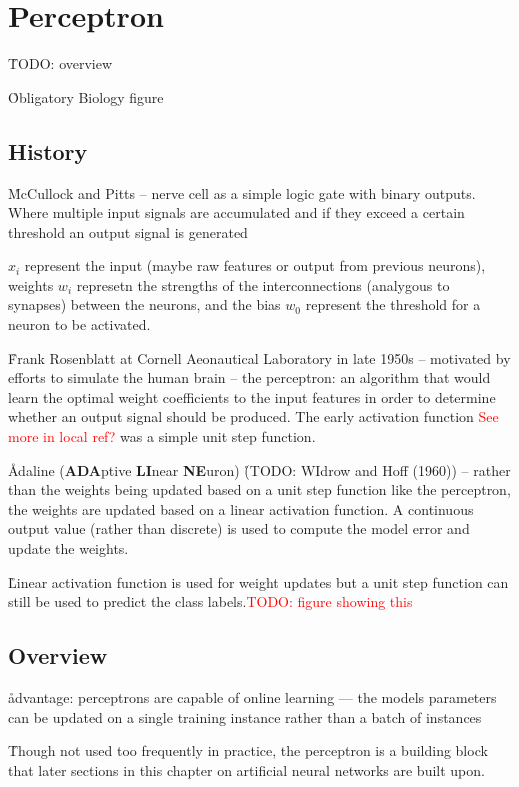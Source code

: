 \section{Perceptron}

\r{TODO: overview}

\r{Obligatory Biology figure}

\subsection{History}

\r{McCullock and Pitts -- nerve cell as a simple logic gate with binary outputs.  Where multiple input signals are accumulated and if they exceed a certain threshold an output signal is generated}

\r{$x_i$ represent the input (maybe raw features or output from previous neurons), weights $w_i$ represetn the strengths of the interconnections (analygous to synapses) between the neurons, and the bias $w_0$ represent the threshold for a neuron to be activated.}

\r{Frank Rosenblatt at Cornell Aeonautical Laboratory in late 1950s -- motivated by efforts to simulate the human brain -- the perceptron: an algorithm that would learn the optimal weight coefficients to the input features in order to determine whether an output signal should be produced. The early activation function \textcolor{red}{See more in local ref?} was a simple unit step function.}

\r{Adaline (\textbf{ADA}ptive \textbf{LI}near \textbf{NE}uron) \r{(TODO: WIdrow and Hoff (1960))} -- rather than the weights being updated based on a unit step function like the perceptron, the weights are updated based on a linear activation function. A continuous output value (rather than discrete) is used to compute the model error and update the weights.}

\r{Linear activation function is used for weight updates but a unit step function can still be used to predict the class labels.\textcolor{red}{TODO: figure showing this}}

\subsection{Overview}

\r{advantage: perceptrons are capable of online learning --- the models parameters can be updated on a single training instance rather than a batch of instances}

\r{Though not used too frequently in practice, the perceptron is a building block that later sections in this chapter on artificial neural networks are built upon.}

